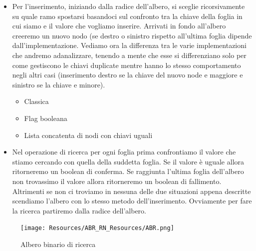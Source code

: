 \begin{itemize}
  \item Per l'inserimento, iniziando dalla radice dell'albero, si sceglie ricorsivamente su quale ramo spostarsi basandoci sul confronto tra la chiave della foglia in cui
  siamo e il valore che vogliamo inserire. Arrivati in fondo all'albero creeremo un nuovo nodo (se destro o sinistro rispetto all'ultima foglia dipende 
  dall'implementazione.
  Vediamo ora la differenza tra le varie implementazioni che andremo adanalizzare, tenendo a mente che esse si differenziano solo per come gestiscono le chiavi    
  duplicate mentre hanno lo stesso comportamento negli altri casi (inserimento destro se la chiave del nuovo node e maggiore e sinistro se la chiave e minore).
    \begin{itemize}
      \item Classica
      \item Flag booleana
      \item Lista concatenta di nodi con chiavi uguali
    \end{itemize}
  \item Nel operazione di ricerca per ogni foglia prima confrontiamo il valore che stiamo cercando con quella della suddetta foglia. Se il valore è uguale allora ritorneremo
  un boolean di conferma. Se raggiunta l'ultima foglia dell'albero non trovassimo il valore allora ritorneremo un boolean di fallimento. Altrimenti se non ci
  troviamo in nessuna delle due situazioni appena descritte scendiamo l'albero con lo stesso metodo dell'inserimento. Ovviamente per fare la ricerca partiremo
  dalla radice dell'albero.
\end{itemize}

\begin{figure}[H]
  \centering
  \texttt{[image: Resources/ABR\_RN\_Resources/ABR.png]}
  \caption{Albero binario di ricerca}
  \label{fig:ABR}
\end{figure}

